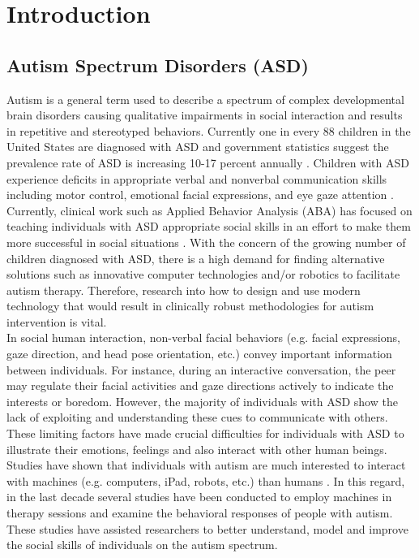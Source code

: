 \chapter{Introduction}



\section{Autism Spectrum Disorders (ASD)}
Autism is a general term used to describe a spectrum of complex developmental
brain disorders causing qualitative impairments in social interaction and results in
repetitive and stereotyped behaviors. Currently one in every 88 children in the United
States are diagnosed with ASD and government statistics suggest the prevalence rate of
ASD is increasing 10-17 percent annually \cite{Fetch2002}. Children with ASD experience deficits in
appropriate verbal and nonverbal communication skills including motor control, emotional
facial expressions, and eye gaze attention \cite{RobotPlaymate2002}. Currently, clinical work such as Applied
Behavior Analysis (ABA) \cite{RollingRobot2002, MobileRobotic2002} has focused on teaching individuals with ASD
appropriate social skills in an effort to make them more successful in social situations \cite{Behavioral1964}.
With the concern of the growing number of children diagnosed with ASD, there is a high
demand for finding alternative solutions such as innovative computer technologies and/or
robotics to facilitate autism therapy. Therefore, research into how to design and use modern
technology that would result in clinically robust methodologies for autism intervention is
vital.\\

In social human interaction, non-verbal facial behaviors (e.g. facial expressions,
gaze direction, and head pose orientation, etc.) convey important information between
individuals. For instance, during an interactive conversation, the peer may regulate their
facial activities and gaze directions actively to indicate the interests or boredom. However,
the majority of individuals with ASD show the lack of exploiting and understanding these
cues to communicate with others. These limiting factors have made crucial difficulties for
individuals with ASD to illustrate their emotions, feelings and also interact with other
human beings. Studies have shown that individuals with autism are much interested to
interact with machines (e.g. computers, iPad, robots, etc.) than humans \cite{SocialInteract2003}. In this regard,
in the last decade several studies have been conducted to employ machines in therapy
sessions and examine the behavioral responses of people with autism. These studies have
assisted researchers to better understand, model and improve the social skills of individuals
on the autism spectrum.\\

